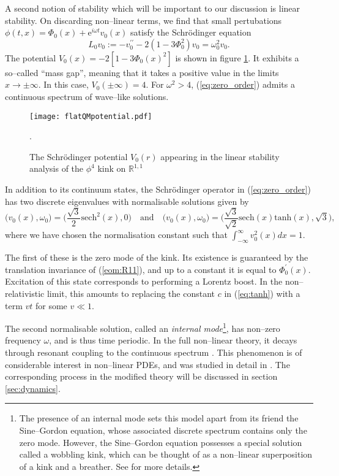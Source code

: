 A second notion of stability which will be important to our discussion is linear stability. On discarding non--linear terms, we find that small pertubations $\phi(t,x)=\Phi_0(x)+\mathrm{e}^{i\omega t}v_0(x)$ satisfy the Schr\"odinger equation
\begin{equation}
\label{eq:zero_order}
L_0v_0:=-v_0^{\prime\prime} - 2(1-3\Phi_0^2)v_0 = \omega^2_0v_0.
\end{equation}
The potential $V_0(x)=-2[1-3\Phi_0(x)^2]$ is shown in figure \ref{fig:flatQMpotential}. It exhibits a so--called ``mass gap'', meaning that it takes a positive value in the limits $x\rightarrow\pm\infty$. In this case, $V_0(\pm\infty)=4$. For $\omega^2>4$, (\ref{eq:zero_order}) admits a continuous spectrum of wave--like solutions.

\begin{figure}
\texttt{[image: flatQMpotential.pdf]}
\caption{\label{fig:flatQMpotential}The Schr\"odinger potential $V_0(r)$ appearing in the linear stability analysis of the $\phi^4$ kink on $\mathbb{R}^{1,1}$}.
\end{figure}

In addition to its continuum states, the Schr\"odinger operator in (\ref{eq:zero_order}) has two discrete eigenvalues with normalisable solutions given by
\begin{equation}
\label{eq:flat_vib_modes}
\big(v_0(x),\omega_0\big) = \bigg(\frac{\sqrt{3}}{2}\mathrm{sech}^2(x),0\bigg) \quad \mathrm{and} \quad
\big(v_0(x),\omega_0\big) = \bigg(\frac{\sqrt{3}}{\sqrt{2}}\mathrm{sech}(x)\mathrm{tanh}(x),\sqrt{3}\bigg),
\end{equation}
where we have chosen the normalisation constant such that $\int_{-\infty}^{\infty}v_0^2(x)dx=1$.

The first of these is the zero mode of the kink. Its existence is guaranteed by the translation invariance of (\ref{eom:R11}), and up to a constant it is equal to $\Phi_0^\prime(x)$. Excitation of this state corresponds to performing a Lorentz boost. In the non--relativistic limit, this amounts to replacing the constant $c$ in (\ref{eq:tanh}) with a term $vt$ for some $v\ll 1$.

The second normalisable solution, called an \textit{internal mode}\footnote{The presence of an internal mode sets this model apart from its friend the Sine--Gordon equation, whose associated discrete spectrum contains only the zero mode. However, the Sine--Gordon equation possesses a special solution called a wobbling kink, which can be thought of as a non--linear superposition of a kink and a breather. See \cite{Segur} for more details.}, has non--zero frequency $\omega$, and is thus time periodic. In the full non--linear theory, it decays through resonant coupling to the continuous spectrum \cite{Manton&Merabet}. This phenomenon is of considerable interest in non--linear PDEs, and was studied in detail in \cite{SW98}. The corresponding process in the modified theory will be discussed in section \ref{sec:dynamics}.

